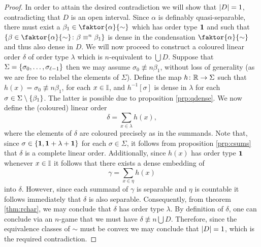 \begin{proof}
	\smallskip	In order to attain the desired contradiction we will show that $\left\lvert D\right\rvert=1$, contradicting that $D$ is an open interval.  Since $\alpha$ is definably quasi-separable, there must exist a $\beta_1\in\faktor{\alpha}{\sim}$ which has order type $\mathbf{1}$ and such that $\setbuild{\beta\in\faktor{\alpha}{\sim}}{\beta\nequiv{n}\beta_1}$ is dense in the condensation $\faktor{\alpha}{\sim}$ and thus also dense in $D$.  We will now proceed to construct a coloured linear order $\delta$ of order type $\lambda$ which is $n$-equivalent to $\bigcup D$.  Suppose that $\Sigma=\left\lbrace \sigma_0,\dotsc,\sigma_{\ell-1}\right\rbrace$ then we may assume $\sigma_0\nequiv{n}\beta_1$, without loss of generality (as we are free to relabel the elements of $\Sigma$).  Define the map $h\colon\mathbb{R}\to\Sigma$ such that $h(x)=\sigma_0\nequiv{n}\beta_1$, for each $x\in\mathbb{I}$, and $h^{-1}[\sigma]$ is dense in $\lambda$ for each $\sigma\in\Sigma\setminus\left\lbrace \beta_1\right\rbrace$.  The latter is possible due to proposition \ref{prp:qdense}.  We now define the (coloured) linear order
	\begin{equation}
		\delta=\sum_{x\in\lambda}h(x),
	\end{equation}
	where the elements of $\delta$ are coloured precisely as in the summands.  Note that, since $\sigma\in\left\lbrace \mathbf{1},\mathbf{1}+\lambda+\mathbf{1}\right\rbrace$ for each $\sigma\in\Sigma$, it follows from proposition \ref{prp:csums} that $\delta$ is a complete linear order.  Additionally, since $h(x)$ has order type $\mathbf{1}$ whenever $x\in\mathbb{I}$ it follows that there exists a dense embedding of
	\begin{equation}
		\gamma=\sum_{x\in\eta}h(x)
	\end{equation}
	into $\delta$.  However, since each summand of $\gamma$ is separable and $\eta$ is countable it follows immediately that $\delta$ is also separable.  Consequently, from theorem \ref{thm:rchar}, we may conclude that $\delta$ has order type $\lambda$.  By definition of $\delta$, one can conclude via an $n$-game that we must have $\delta\nequiv{n}\bigcup D$.  Therefore, since the equivalence classes of $\sim$ must be convex we may conclude that $\left\lvert D\right\rvert=1$, which is the required contradiction.
\end{proof}
